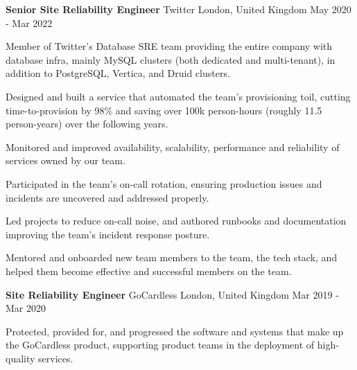 \begin{cventries}
	\cventry
	{\textbf{Senior Site Reliability Engineer}} %
	{Twitter} %
	{London, United Kingdom} %
	{May 2020 - Mar 2022} %
	{
		\begin{cvitems} %
			\item {
			            Member of Twitter's Database SRE team providing the entire company with
			            database infra, mainly MySQL clusters (both dedicated and
			            multi-tenant), in addition to PostgreSQL, Vertica, and Druid clusters.
			      }
			\item {
			            Designed and built a service that automated the team's provisioning
			            toil, cutting time-to-provision by 98\% and saving over 100k
			            person-hours (roughly 11.5 person-years) over the following years.
			      }
			\item {
			            Monitored and improved availability, scalability, performance and
			            reliability of services owned by our team.
			      }
			\item {
			            Participated in the team's on-call rotation, ensuring production issues
			            and incidents are uncovered and addressed properly.
			      }
			\item{
			            Led projects to reduce on-call noise, and authored runbooks and
			            documentation improving the team's incident response posture.
			      }
			\item {
			            Mentored and onboarded new team members to the team, the tech stack,
			            and helped them become effective and successful members on the team.
			      }
		\end{cvitems}
	}

	\cventry
	{\textbf{Site Reliability Engineer}} %
	{GoCardless} %
	{London, United Kingdom} %
	{Mar 2019 - Mar 2020} %
	{
		\begin{cvitems} %
			\item {
			            Protected, provided for, and progressed the software and systems that make
			            up the GoCardless product, supporting product teams in the deployment
			            of high-quality services.
			      }
		\end{cvitems}
	}


\end{cventries}
